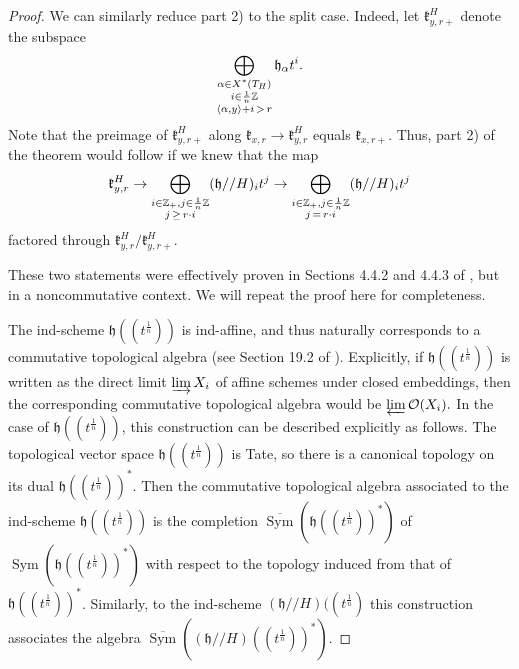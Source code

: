 \documentclass[12pt]{article}
\DeclareMathOperator{\Sym}{Sym}
\theoremstyle{remark}
\begin{document}
\begin{proof}
We can similarly reduce part 2) to the split case. Indeed, let $\mathfrak{k}_{y,r+}^H$ denote the subspace
\[
\displaystyle\bigoplus_{\substack{\alpha\in X^*(T_H)\\ i\in\frac{1}{n}\mathbb{Z} \\ \langle\alpha,y\rangle+i\thinspace>\thinspace r}}\mathfrak{h}_{\alpha}t^i.
\]
Note that the preimage of $\mathfrak{k}_{y,r+}^H$ along $\mathfrak{k}_{x,r}\rightarrow\mathfrak{k}_{y,r}^H$ equals $\mathfrak{k}_{x,r+}.$ Thus, part 2) of the theorem would follow if we knew that the map
\begin{equation}\label{eq:splittargetcomposition}
\mathfrak{k}^H_{y,r}\rightarrow\displaystyle\bigoplus_{\substack{i\in\mathbb{Z}_+,j\in\frac{1}{n}\mathbb{Z}\\ j\thinspace\geq\thinspace r\cdot i}}(\mathfrak{h}//H)_it^j\rightarrow\displaystyle\bigoplus_{\substack{i\in\mathbb{Z}_+,j\in\frac{1}{n}\mathbb{Z}\\ j\thinspace=\thinspace r\cdot i}}(\mathfrak{h}//H)_it^j
\end{equation}
factored through $\mathfrak{k}^H_{y,r}/\mathfrak{k}^H_{y,r+}.$

These two statements were effectively proven in Sections 4.4.2 and 4.4.3 of \cite{yangMP}, but in a noncommutative context. We will repeat the proof here for completeness.

The ind-scheme $\mathfrak{h}((t^{\frac{1}{n}}))$ is ind-affine, and thus naturally corresponds to a commutative topological algebra (see Section 19.2 of \cite{FG2}). Explicitly, if $\mathfrak{h}((t^{\frac{1}{n}}))$ is written as the direct limit $\varinjlim X_i$ of affine schemes under closed embeddings, then the corresponding commutative topological algebra would be $\varprojlim\mathcal{O}(X_i).$ In the case of $\mathfrak{h}((t^{\frac{1}{n}}))$, this construction can be described explicitly as follows. The topological vector space $\mathfrak{h}((t^{\frac{1}{n}}))$ is Tate, so there is a canonical topology on its dual $\mathfrak{h}((t^{\frac{1}{n}}))^*$. Then the commutative topological algebra associated to the ind-scheme $\mathfrak{h}((t^{\frac{1}{n}}))$ is the completion $\overline{\Sym}(\mathfrak{h}((t^{\frac{1}{n}}))^*)$ of $\Sym(\mathfrak{h}((t^{\frac{1}{n}}))^*)$ with respect to the topology induced from that of $\mathfrak{h}((t^{\frac{1}{n}}))^*$. Similarly, to the ind-scheme $(\mathfrak{h}//H)((t^{\frac{1}{n}})$ this construction associates the algebra $\overline{\Sym}((\mathfrak{h}//H)((t^{\frac{1}{n}}))^*)$.


\end{proof}
\end{document}
